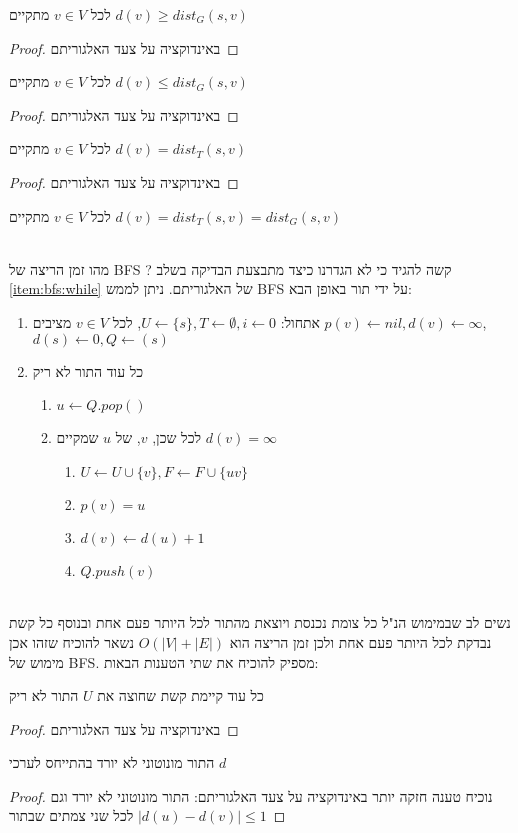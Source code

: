 \begin{claim}
לכל
$v \in V$
מתקיים
$d(v) \geq dist_G(s, v)$
\end{claim}
\begin{proof}
באינדוקציה על צעד האלגוריתם
\end{proof}

\begin{claim}
לכל
$v \in V$
מתקיים
$d(v) \leq dist_G(s,v)$
\end{claim}
\begin{proof}
באינדוקציה על צעד האלגוריתם
\end{proof}

\begin{claim}
לכל
$v \in V$
מתקיים
$d(v) = dist_T(s,v)$
\end{claim}
\begin{proof}
באינדוקציה על צעד האלגוריתם
\end{proof}


\begin{theorem}
לכל
$v \in V$
מתקיים
$d(v) = dist_T(s,v) = dist_G(s,v)$
\end{theorem}
\\
\noindent
מהו זמן הריצה של BFS ? קשה להגיד כי לא הגדרנו כיצד מתבצעת הבדיקה בשלב 
\ref{item:bfs:while}
של האלגוריתם. 
ניתן לממש BFS על ידי תור באופן הבא:
\begin{enumerate}
\item
אתחול:
$U \leftarrow \{s\}, T \leftarrow \emptyset, i \leftarrow 0$, 
לכל 
$v \in V$
מציבים
$p(v) \leftarrow nil, d(v) \leftarrow \infty$,
$d(s) \leftarrow 0, Q \leftarrow (s)$
\item 
כל עוד התור לא ריק 
\begin{enumerate}
	\item
	$u \leftarrow Q.pop()$
\item
לכל שכן, $v$, של $u$ שמקיים 
$d(v) = \infty$
		\begin{enumerate}
		\item
		$U \leftarrow U \cup \{v\}, F \leftarrow F \cup \{uv\}$
		\item
		$p(v) = u$
		\item
		$d(v) \leftarrow d(u) + 1$
		\item
		$Q.push(v)$
		\end{enumerate}
	\end{enumerate}
\end{enumerate}
\\
\noindent
נשים לב שבמימוש הנ"ל כל צומת נכנסת ויוצאת מהתור לכל היותר פעם אחת 
ובנוסף כל קשת נבדקת לכל היותר פעם אחת ולכן זמן הריצה הוא 
$O(|V| + |E|)$
נשאר להוכיח שזהו אכן מימוש של BFS.
מספיק להוכיח את שתי הטענות הבאות:
\begin{claim}
כל עוד קיימת קשת שחוצה את $U$ התור לא ריק
\end{claim}
\begin{proof}
באינדוקציה על צעד האלגוריתם
\end{proof}

\begin{claim}
התור מונוטוני לא יורד בהתייחס לערכי 
$d$
\end{claim}
\begin{proof}
נוכיח טענה חזקה יותר באינדוקציה על צעד האלגוריתם: 
התור מונוטוני לא יורד וגם 
$|d(u) - d(v)| \leq 1$
לכל שני צמתים שבתור
\end{proof}
